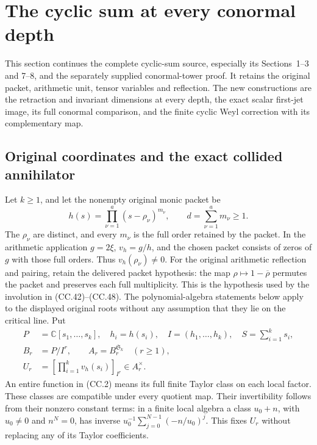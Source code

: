 \section{The cyclic sum at every conormal depth}
\label{sec:cyclic-sum-conormal}

This section continues the complete cyclic-sum source, especially its
Sections~1--3 and 7--8, and the separately supplied conormal-tower proof.
It retains the original packet, arithmetic unit, tensor variables and
reflection.  The new constructions are the retraction and invariant
dimensions at every depth, the exact scalar first-jet image, its full
conormal comparison, and the finite cyclic Weyl correction with its
complementary map.

\subsection{Original coordinates and the exact collided annihilator}

Let \(k\geq1\), and let the nonempty original monic packet be
\[
 h(s)=\prod_{\nu=1}^{a}(s-\rho_\nu)^{m_\nu},
 \qquad d=\sum_{\nu=1}^{a}m_\nu\geq1.
 \tag{CC.1}
\]
The \(\rho_\nu\) are distinct, and every \(m_\nu\) is the full order
retained by the packet.  In the arithmetic application
\(g=2\xi\), \(v_h=g/h\), and the chosen packet consists of zeros of
\(g\) with those full orders.  Thus \(v_h(\rho_\nu)\ne0\).
For the original arithmetic reflection and pairing, retain the
delivered packet hypothesis: the map
\(\rho\mapsto1-\overline\rho\) permutes the packet and preserves
each full multiplicity.  This is the hypothesis used by the
involution in (CC.42)--(CC.48).
The polynomial-algebra statements below apply to the displayed original
roots without any assumption that they lie on the critical line.
Put
\[
\begin{aligned}
 P&=\mathbb C[s_1,\ldots,s_k],\quad h_i=h(s_i),\quad I=(h_1,\ldots,h_k),
 \quad S=\sum_{i=1}^k s_i,\\
 B_r&=P/I^r,\qquad A_r=B_r^{\mathfrak S_k}\quad(r\geq1),\\
 U_r&=\left[\prod_{i=1}^k v_h(s_i)\right]_{I^r}\in A_r^\times .
\end{aligned}
\tag{CC.2}
\]
An entire function in (CC.2) means its full finite Taylor class on
each local factor.  These classes are compatible under every quotient
map.  Their invertibility follows from their nonzero constant terms:
in a finite local algebra a class \(u_0+n\), with \(u_0\ne0\) and
\(n^N=0\), has inverse
\(u_0^{-1}\sum_{j=0}^{N-1}(-n/u_0)^j\).
This fixes \(U_r\) without replacing any of its Taylor coefficients.

